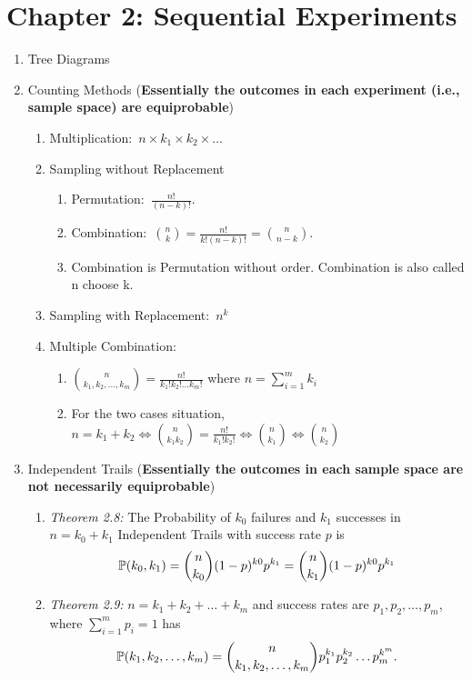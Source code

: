 \section*{Chapter 2: Sequential Experiments}
\begin{enumerate}
    \item Tree Diagrams
    \item Counting Methods (\textbf{Essentially the outcomes in each experiment (i.e., sample space) are equiprobable})
    \begin{enumerate}
        \item Multiplication:~$n\times k_1\times k_2\times \ldots$
        \item Sampling without Replacement
        \begin{enumerate}
            \item Permutation:~$\frac{n!}{(n-k)!}$.
            \item Combination:~$\binom{n}{k}=\frac{n!}{k!(n-k)!}=\binom{n}{n-k}$.
            \item Combination is Permutation without order. Combination is also called n choose k.
        \end{enumerate}
        \item Sampling with Replacement:~$n^k$
        \item Multiple Combination:{
            \begin{enumerate}
                \item $\binom{n}{k_1,k_2,\ldots,k_m}=\frac{n!}{k_1!k_2!\ldots k_m!}$ where $n=\sum_{i=1}^{m}k_i$
                \item For the two cases situation, $n=k_1+k_2\iff \binom{n}{k_1k_2}=\frac{n!}{k_1!k_2!}\iff\binom{n}{k_1}\iff\binom{n}{k_2}$
            \end{enumerate}
            }
    \end{enumerate}
    \item Independent Trails (\textbf{Essentially the outcomes in each sample space are not necessarily equiprobable})
    \begin{enumerate}
        \item \textit{Theorem 2.8:} The Probability of $k_0$ failures and $k_1$ successes in $n=k_0+k_1$ Independent Trails with success rate $p$ is \[\P{k_0, k_1}=\binom{n}{k_0}(1-p)^{k0}p^{k_1}=\binom{n}{k_1}(1-p)^{k0}p^{k_1}\]
        \item \textit{Theorem 2.9:} $n=k_1+k_2+\ldots+k_m$ and success rates are $p_1, p_2,\ldots,p_m$, where $\sum_{i=1}^{m}p_i=1$ has 
        $$\P{k_1,k_2,\ldots,k_m}=\binom{n}{k_1,k_2,\ldots,k_m}p_1^{k_1}p_2^{k_2}\ldots p_m^{k^m}.$$
    \end{enumerate}
\end{enumerate}